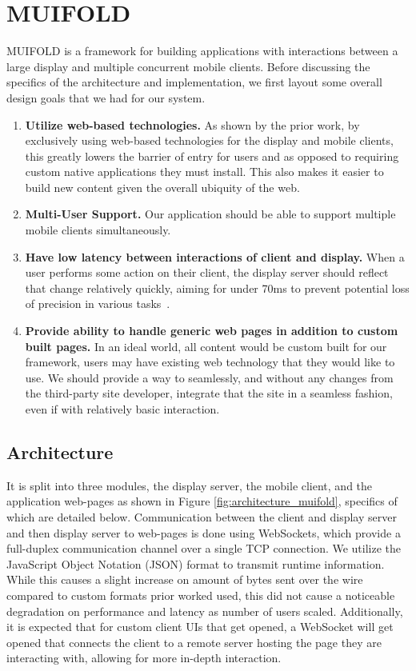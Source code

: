\section{MUIFOLD}

MUIFOLD is a framework for building applications with interactions
between a large display and multiple concurrent mobile clients.
Before discussing the specifics of the architecture and
implementation, we first layout some overall design goals that
we had for our system.

\begin{enumerate}
    \item \textbf{Utilize web-based technologies.} As shown by
    the prior work, by exclusively using web-based technologies
    for the display and mobile clients, this greatly lowers the
    barrier of entry for users and as opposed to requiring custom
    native applications they must install. This also makes it easier
    to build new content given the overall ubiquity of the web.
    \item \textbf{Multi-User Support.} Our application should
    be able to support multiple mobile clients simultaneously.
    \item \textbf{Have low latency between interactions of client and display.} When a user performs some action on their client, the
    display server should reflect that change relatively quickly,
    aiming for under 70ms to prevent potential loss of precision
    in various tasks~\cite{ivkovic_quantifying_2015}.
    \item \textbf{Provide ability to handle generic web pages in
    addition to custom built pages.} In an ideal world, all
    content would be custom built for our framework, users may
    have existing web technology that they would like to use. We
    should provide a way to seamlessly, and without any changes from
    the third-party site developer, integrate that the site in a
    seamless fashion, even if with relatively basic interaction.
\end{enumerate}

\subsection{Architecture}

It is split into three modules, the display server, the
mobile client, and the application web-pages as shown in Figure \ref{fig:architecture_muifold},
specifics of which are detailed below. Communication between the
client and display server and then display server to web-pages is
done using WebSockets, which provide a full-duplex
communication channel over a single TCP connection. We utilize the
JavaScript Object Notation (JSON) format to transmit runtime
information. While this causes a slight increase on amount of bytes
sent over the wire compared to custom formats prior worked used,
this did not cause a noticeable degradation on performance and
latency as number of users scaled. Additionally, it is expected
that for custom client UIs that get opened, a WebSocket will
get opened that connects the client to a remote server hosting
the page they are interacting with, allowing for more
in-depth interaction.

